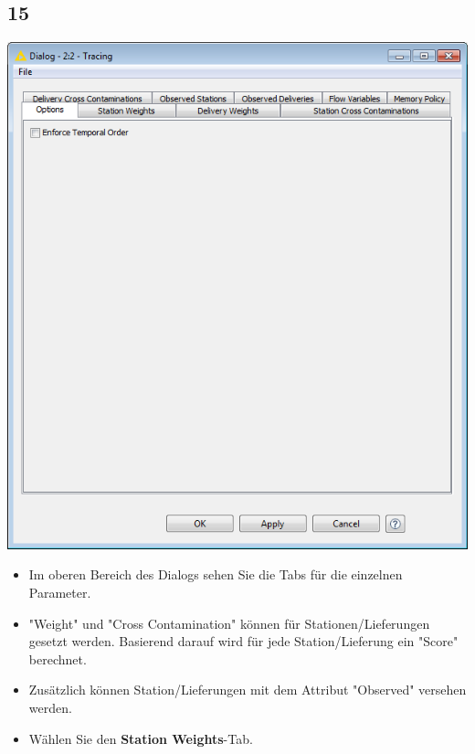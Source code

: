 \documentclass{beamer}
\begin{document}
\subsection{15}
\begin{frame}
	\begin{center}
  		\includegraphics[height=0.5\textheight]{15.png}
	\end{center}
	\begin{itemize}
		\item Im oberen Bereich des Dialogs sehen Sie die Tabs für die einzelnen Parameter.
		\item "Weight" und "Cross Contamination" können für Stationen/Lieferungen gesetzt werden. Basierend darauf wird für jede Station/Lieferung ein "Score" berechnet.
		\item Zusätzlich können Station/Lieferungen mit dem Attribut "Observed" versehen werden.
		\item Wählen Sie den \textbf{Station Weights}-Tab.
	\end{itemize}
\end{frame}
\end{document}
